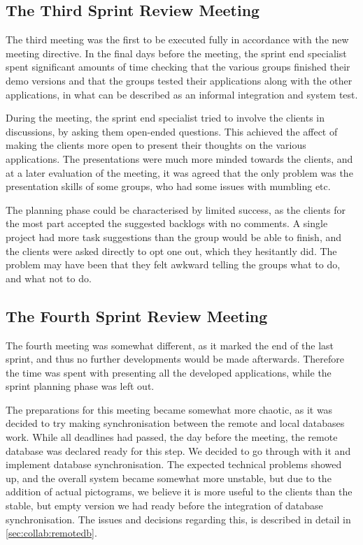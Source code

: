 \subsection{The Third Sprint Review Meeting}
\label{collab:sprintend:three}
The third meeting was the first to be executed fully in accordance with the new meeting directive. In the final days before the meeting, the sprint end specialist spent significant amounts of time checking that the various groups finished their demo versions and that the groups tested their applications along with the other applications, in what can be described as an informal integration and system test. 

During the meeting, the sprint end specialist tried to involve the clients in discussions, by asking them open-ended questions. This achieved the affect of making the clients more open to present their thoughts on the various applications. The presentations were much more minded towards the clients, and at a later evaluation of the meeting, it was agreed that the only problem was the presentation skills of some groups, who had some issues with mumbling etc.

The planning phase could be characterised by limited success, as the clients for the most part accepted the suggested backlogs with no comments. A single project had more task suggestions than the group would be able to finish, and the clients were asked directly to opt one out, which they hesitantly did. The problem may have been that they felt awkward telling the groups what to do, and what not to do.

\subsection{The Fourth Sprint Review Meeting}
\label{collab:sprintend:four}
The fourth meeting was somewhat different, as it marked the end of the last sprint, and thus no further developments would be made afterwards. Therefore the time was spent with presenting all the developed applications, while the sprint planning phase was left out. 

The preparations for this meeting became somewhat more chaotic, as it was decided to try making synchronisation between the remote and local databases work. While all deadlines had passed, the day before the meeting, the remote database was declared ready for this step. We decided to go through with it and implement database synchronisation. The expected technical problems showed up, and the overall system became somewhat more unstable, but due to the addition of actual pictograms, we believe it is more useful to the clients than the stable, but empty version we had ready before the integration of database synchronisation. The issues and decisions regarding this, is described in detail in \cref{sec:collab:remotedb}.

